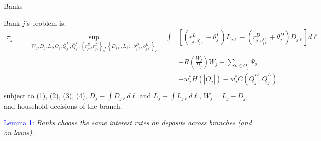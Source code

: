 \documentclass[notes,10pt, aspectratio=169]{beamer}
\newenvironment{wideitemize}{\itemize\addtolength{\itemsep}{10pt}}{\enditemize}
\begin{document}
\begin{frame}{Banks}

    \begin{wideitemize}
    \item Bank $j$'s problem is: 
    $$
    \begin{aligned}
     \pi_j=\quad \sup_{ W_j, D_j, L_j, O_j, \bar{Q}_j^D, \bar{Q}_j^L, \left\{r_{j o}^D, r_{j o}^L\right\}_o,\left\{D_{j \ell}, L_{j \ell}, o_{j \ell}^D, o_{j \ell}^L\right\}_{\ell}} \quad \int & \left[\left(r_{j, o_{j \ell}^L}^L-\theta_j^L\right) L_{j \ell}-\left(r_{j, o_{j \ell}^D}^D+\theta_j^D\right) D_{j \ell}\right] d \ell \\ & -R\left(\frac{W_j}{D_j}\right) W_j-\sum_{o \in O_j} \Psi_o \\
    &  -w_j^* H\left(\left|O_j\right|\right)-w_j^* C\left(\bar{Q}_j^D, \bar{Q}_j^L\right) \\
    \end{aligned}
    $$
    subject to (1), (2), (3), (4),  $D_j \equiv \int D_{j \ell} d \ell$ and $L_j \equiv \int L_{j \ell} d \ell$, $W_j=L_j -D_j$, and household decisions of the branch.



        \item \textcolor{blue}{Lemma 1}: \textit{Banks choose the same interest rates on deposits across branches (and on loans). } 
        \end{wideitemize}
    
    \end{frame}
\end{document}
